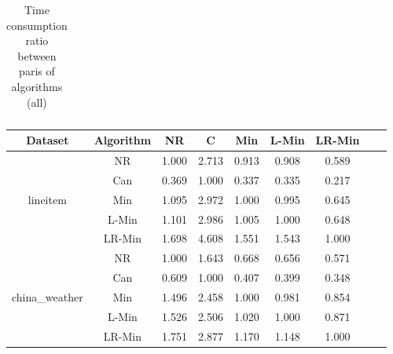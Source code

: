 \documentclass[11pt]{book}
\begin{document}
\begin{table}
\begin{tabular}{|c|c|c|c|c|c|c|c|c|}
    \hline

    
\end{tabular}

	\caption{Time consumption ratio between paris of algorithms (all)}

\end{table}


\begin{table}

	\centering
	
\begin{tabular}{|c|c|c|c|c|c|c|c|c|}

    \hline
    Dataset &
    	Algorithm &
    	NR &
    	C &
    	Min &
    	L-Min &
    	LR-Min \\
    	    
    \hline
    \multirow{5}{*}{lineitem}
         & NR & 1.000 & 2.713 & 0.913 & 0.908 & 0.589 \\                                                                                                                                                             
         & Can & 0.369 & 1.000 & 0.337 & 0.335 & 0.217 \\                                                                                                                                                            
         & Min & 1.095 & 2.972 & 1.000 & 0.995 & 0.645 \\                                                                                                                                                            
         & L-Min & 1.101 & 2.986 & 1.005 & 1.000 & 0.648 \\                                                                                                                                                          
         & LR-Min & 1.698 & 4.608 & 1.551 & 1.543 & 1.000 \\ 	

    \hline
    \multirow{5}{*}{china\_weather}
         & NR & 1.000 & 1.643 & 0.668 & 0.656 & 0.571 \\                                                                                                                                                             
         & Can & 0.609 & 1.000 & 0.407 & 0.399 & 0.348 \\                                                                                                                                                            
         & Min & 1.496 & 2.458 & 1.000 & 0.981 & 0.854 \\                                                                                                                                                            
         & L-Min & 1.526 & 2.506 & 1.020 & 1.000 & 0.871 \\                                                                                                                                                          
         & LR-Min & 1.751 & 2.877 & 1.170 & 1.148 & 1.000 \\
         

\end{tabular}
\end{table}
\end{document}
